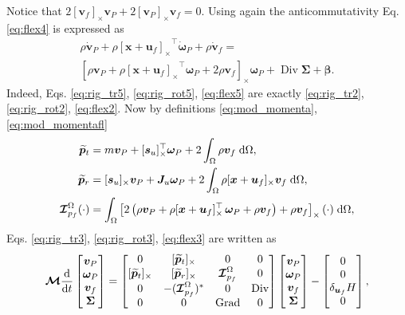 \documentclass{svjour3}                     %
\DeclareMathOperator*{\Grad}{Grad}
\DeclareMathOperator*{\Div}{Div}
\newcommand{\crmat}[1]{\ensuremath{[#1]_{\times}}}
\begin{document}
Notice that $2 \crmat{\bm{v}_f}\bm{v}_P + 2 \crmat{\bm{v}_P}\bm{v}_f = 0$. Using again the anticommutativity Eq. \eqref{eq:flex4} is expressed as 
\begin{equation}
\label{eq:flex5}
\begin{split}
\rho \dot{\bm{v}}_P + \rho \crmat{\bm{x}+\bm{u}_f}^\top \dot{\bm\omega}_P  + \rho \dot{\bm{v}}_f = \\
\left[\rho \bm{v}_P + \rho \crmat{\bm{x}+\bm{u}_f}^\top \bm\omega_P + 2 \rho \bm{v}_f \right]_\times \bm\omega_P + \Div{\bm\Sigma} + \bm\beta.
\end{split}
\end{equation}
Indeed, Eqs. \eqref{eq:rig_tr5}, \eqref{eq:rig_rot5}, \eqref{eq:flex5} are exactly \eqref{eq:rig_tr2}, \eqref{eq:rig_rot2}, \eqref{eq:flex2}. Now by definitions \eqref{eq:mod_momenta}, \eqref{eq:mod_momentafl}
\begin{align*}
\widetilde{\bm{p}}_t &= m \bm{v}_P + \crmat{\bm{s}_u}^\top \bm\omega_P +2 \int_{\Omega} \rho \bm{v}_f \d{\Omega}, \\
\widetilde{\bm{p}}_r &= \crmat{\bm{s}_u} \bm{v}_P + \bm{J}_u \bm\omega_P + 2 \int_{\Omega} \rho \crmat{\bm{x}+\bm{u}_f} {\bm{v}}_f \d{\Omega}, \\
\bm{\mathcal{I}}_{p_f}^\Omega(\cdot) &= \int_{\Omega} \left[ 2 \left(\rho \bm{v}_P + \rho \crmat{\bm{x}+\bm{u}_f}^\top \, \bm\omega_P +\rho \bm{v}_f\right) + \rho \bm{v}_f \right]_\times (\cdot) \d{\Omega}, 
\end{align*}
Eqs. \eqref{eq:rig_tr3}, \eqref{eq:rig_rot3}, \eqref{eq:flex3} are written as 
\begin{equation}
\bm{\mathcal{M}}
\diff{}{t}
\begin{bmatrix}
\bm{v}_P \\ \bm\omega_P  \\ \bm{v}_f  \\ \bm\Sigma \\
\end{bmatrix} = 
\begin{bmatrix}
0 & \crmat{\widetilde{\bm{p}}_t} & 0 & 0 \\
\crmat{\widetilde{\bm{p}}_t} & \crmat{\widetilde{\bm{p}}_r} & \bm{\mathcal{I}}_{p_f}^\Omega & 0 \\
0 & -(\bm{\mathcal{I}}_{p_f}^\Omega)^* & 0 & \Div \\
0 & 0 & \Grad & 0 \\
\end{bmatrix}
\begin{bmatrix}
\bm{v}_P \\ \bm\omega_P  \\ \bm{v}_f  \\ \bm\Sigma \\
\end{bmatrix} - 
\begin{bmatrix}
0 \\ 0  \\ \delta_{\bm{u}_f}H  \\ 0 \\
\end{bmatrix},
\end{equation} 
\end{document}
